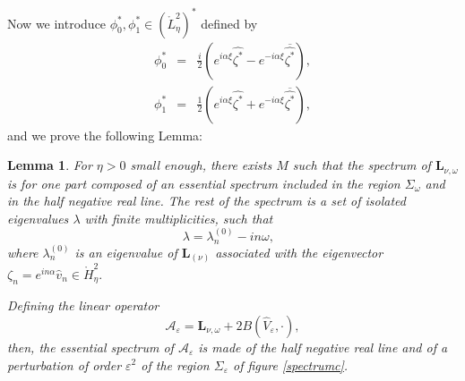 \documentclass[11pt]{article}
\newtheorem{lemma}[theorem]{Lemma}
\begin{document}
Now we introduce $\phi _{0}^{\ast },\phi _{1}^{\ast }\in (\mathring{L}%
_{\eta}^{2})^{\ast }$ defined by%
\begin{eqnarray*}
\phi _{0}^{\ast } &=&\frac{i}{2}(e^{i\alpha \xi }\widehat{\zeta ^{\ast }}%
-e^{-i\alpha \xi }\overline{\widehat{\zeta ^{\ast }}}), \\
\phi _{1}^{\ast } &=&\frac{1}{2}(e^{i\alpha \xi }\widehat{\zeta ^{\ast }}%
+e^{-i\alpha \xi }\overline{\widehat{\zeta ^{\ast }}}),
\end{eqnarray*}%
and we prove the following Lemma:

\begin{lemma}
\label{lem:structure Lomega}For $\eta>0$ small enough, 
there exists $M$ such
that the spectrum of $\boldsymbol{L}_{\nu ,\omega }$ is for one part composed of an
essential spectrum included in the region $\Sigma _{\omega }$
and in the half negative real line. The rest of
the spectrum is a set of isolated eigenvalues $\lambda $ with finite
multiplicities, such that%
\begin{equation*}
\lambda =\lambda _{n}^{(0)}-in\omega ,\text{ }
\end{equation*}%
where $\lambda _{n}^{(0)}$ is an eigenvalue of $\boldsymbol{L}_{(\nu )}$
associated with the eigenvector $\zeta _{n}=e^{in\alpha }\widehat{v}_{n}\in 
\mathring{H}_{\eta}^{2}.$

Defining the linear operator%
\begin{equation*}
\mathcal{A}_\varepsilon = \boldsymbol{L}_{\nu ,\omega }+2B(\widehat{V}_{\varepsilon },\cdot ),
\end{equation*}%
then, the essential spectrum of $\mathcal{A}_\varepsilon$ is made of the half negative real line and of  
a perturbation of order $\varepsilon^2$ of the region $\Sigma_\varepsilon$ of figure \ref{spectrumc}.


\end{lemma}
\end{document}
